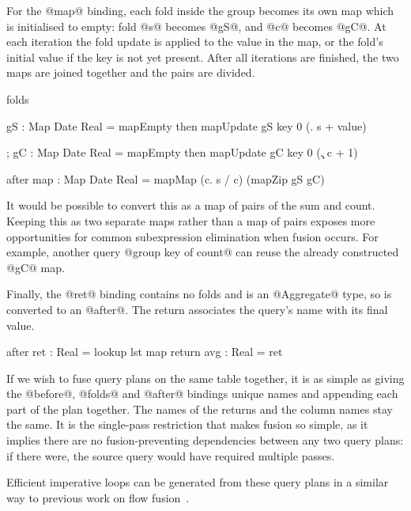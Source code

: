 For the @map@ binding, each fold inside the group becomes its own map which is initialised to empty: fold @s@ becomes @gS@, and @c@ becomes @gC@.
At each iteration the fold update is applied to the value in the map, or the fold's initial value if the key is not yet present.
After all iterations are finished, the two maps are joined together and the pairs are divided.
\begin{code}
  folds  { gS  : Map Date Real = mapEmpty
           then mapUpdate gS key 0 (\s. s + value)

         ; gC  : Map Date Real = mapEmpty
           then mapUpdate gC key 0 (\c. c + 1) }

  after  { map : Map Date Real
            = mapMap (\s c. s / c) (mapZip gS gC) }
\end{code}

It would be possible to convert this as a map of pairs of the sum and count.
Keeping this as two separate maps rather than a map of pairs exposes more opportunities for common subexpression elimination when fusion occurs.
For example, another query @group key of count@ can reuse the already constructed @gC@ map.

Finally, the @ret@ binding contains no folds and is an @Aggregate@ type, so is converted to an @after@.
The return associates the query's name with its final value.
\begin{code}
  after  { ret : Real = lookup lst map }
  return { avg : Real = ret }
\end{code}


If we wish to fuse query plans on the same table together, it is as simple as giving the @before@, @folds@ and @after@ bindings unique names and appending each part of the plan together.
The names of the returns and the column names stay the same.
It is the single-pass restriction that makes fusion so simple, as it implies there are no fusion-preventing dependencies between any two query plans: if there were, the source query would have required multiple passes.

Efficient imperative loops can be generated from these query plans in a similar way to previous work on flow fusion~\cite{lippmeier2013data}.


